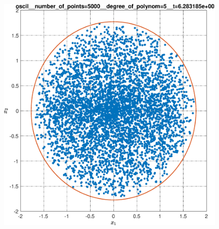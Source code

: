 \documentclass[../main.tex]{subfiles}
\begin{document}
\begin{figure}[ht!]
\begin{minipage}[b]{.3\linewidth}
 	\end{minipage} 
 	\vfill
 	\hspace{-2.5ex}
 	\begin{minipage}[b]{.3\linewidth} 
 		\small
 		\centering 
 		\includegraphics[width=\linewidth]{images/oscil__number_of_points=5000__degree_of_polynom=5__t=2pi.eps}
 		\label{fig:ap:oscilN5103k5T2pi}
 	\end{minipage}
 	\hfill
 	\begin{minipage}[b]{.3\linewidth} 
 		\small
 		\centering

\end{minipage}
\end{figure}
\end{document}
